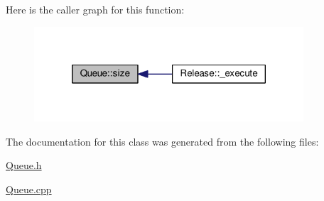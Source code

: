 Here is the caller graph for this function\-:\nopagebreak
\begin{figure}[H]
\begin{center}
\leavevmode
\includegraphics[width=284pt]{class_queue_a4cd92f99b7abc9ec4df32690dc5a037d_icgraph}
\end{center}
\end{figure}




The documentation for this class was generated from the following files\-:\begin{DoxyCompactItemize}
\item 
\hyperlink{_queue_8h}{Queue.\-h}\item 
\hyperlink{_queue_8cpp}{Queue.\-cpp}\end{DoxyCompactItemize}

